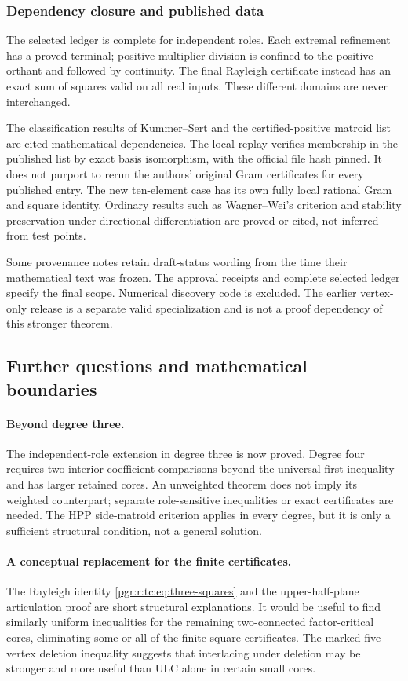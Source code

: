 \documentclass[11pt]{article}
\numberwithin{equation}{section}
\theoremstyle{definition}\newtheorem{definition}[theorem]{Definition}\newtheorem{remark}[theorem]{Remark}
\begin{document}
\subsubsection{Dependency closure and published data}
The selected ledger is complete for independent roles. Each extremal refinement has a proved terminal; positive-multiplier division is confined to the positive orthant and followed by continuity. The final Rayleigh certificate instead has an exact sum of squares valid on all real inputs. These different domains are never interchanged.

The classification results of Kummer--Sert and the certified-positive matroid list are cited mathematical dependencies. The local replay verifies membership in the published list by exact basis isomorphism, with the official file hash pinned. It does not purport to rerun the authors' original Gram certificates for every published entry. The new ten-element case has its own fully local rational Gram and square identity. Ordinary results such as Wagner--Wei's criterion and stability preservation under directional differentiation are proved or cited, not inferred from test points.

Some provenance notes retain draft-status wording from the time their mathematical text was frozen. The approval receipts and complete selected ledger specify the final scope. Numerical discovery code is excluded. The earlier vertex-only release is a separate valid specialization and is not a proof dependency of this stronger theorem.

\subsection{Further questions and mathematical boundaries}\label{pgr:r:ir:sec:questions}
\paragraph{Beyond degree three.}
The independent-role extension in degree three is now proved. Degree four requires two interior coefficient comparisons beyond the universal first inequality and has larger retained cores. An unweighted theorem does not imply its weighted counterpart; separate role-sensitive inequalities or exact certificates are needed. The HPP side-matroid criterion applies in every degree, but it is only a sufficient structural condition, not a general solution.

\paragraph{A conceptual replacement for the finite certificates.}
The Rayleigh identity \eqref{pgr:r:tc:eq:three-squares} and the upper-half-plane articulation proof are short structural explanations. It would be useful to find similarly uniform inequalities for the remaining two-connected factor-critical cores, eliminating some or all of the finite square certificates. The marked five-vertex deletion inequality suggests that interlacing under deletion may be stronger and more useful than ULC alone in certain small cores.
\end{document}
